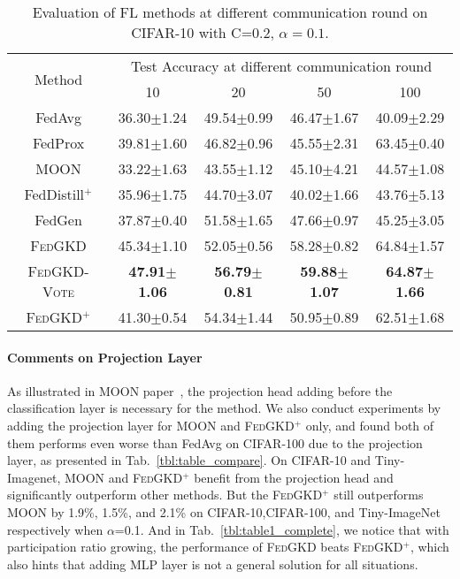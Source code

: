 \documentclass{article} %
\newcommand{\system}{\textsc{FedGKD}\xspace}
\newcommand{\systemled}{\textsc{FedGKD-Vote}\xspace}
\newcommand{\systemplus}{\textsc{FedGKD$^{+}$}\xspace}
\begin{document}
\begin{table}[tb]
\renewcommand\arraystretch{1.1}
\centering
\small
\caption{ Evaluation of FL methods at different communication round on CIFAR-10 with C=0.2, $\alpha=0.1$.}
\begin{tabular}{ccccc}
\hline
\multirow{2}{*}{Method}  & \multicolumn{4}{c}{Test Accuracy at different communication round} \\

\cline{2-5}
   & 10 & 20 & 50 & 100  \\
  \hline
  
  FedAvg  &36.30$\pm$1.24 &49.54$\pm$0.99 &46.47$\pm$1.67 &40.09$\pm$2.29 \\
  \hline
  FedProx  &39.81$\pm$1.60 &46.82$\pm$0.96 &45.55$\pm$2.31 &63.45$\pm$0.40 \\
  \hline
  MOON   &33.22$\pm$1.63 &43.55$\pm$1.12 &45.10$\pm$4.21 &44.57$\pm$1.08  \\
  \hline
  FedDistill$^{+}$ &35.96$\pm$1.75 &44.70$\pm$3.07 &40.02$\pm$1.66 &43.76$\pm$5.13 \\
  \hline
  FedGen  &37.87$\pm$0.40 &51.58$\pm$1.65 &47.66$\pm$0.97 &45.25$\pm$3.05   \\
  \hline
  \system &45.34$\pm$1.10 &52.05$\pm$0.56 &58.28$\pm$0.82 &64.84$\pm$1.57  \\
  \systemled  &\bf{47.91$\pm$1.06} & \bf{56.79$\pm$0.81} &\bf{59.88$\pm$1.07}& \bf{64.87$\pm$1.66}  \\
  \systemplus  &41.30$\pm$0.54 &54.34$\pm$1.44 &50.95$\pm$0.89 &62.51$\pm$1.68  \\
  \bottomrule
  \end{tabular}
 
 \label{tbl:acc_straggler}
\end{table}

\paragraph{Comments on Projection Layer}
As illustrated in MOON paper~\citep{li2021model}, the projection head adding before the classification layer is necessary for the method. We also conduct experiments by  adding the projection layer for MOON and \systemplus only, and found both of them performs even worse than FedAvg on CIFAR-100 due to the projection layer, as presented in Tab.~\ref{tbl:table_compare}. On CIFAR-10 and Tiny-Imagenet, MOON and \systemplus benefit from the projection head and significantly outperform other methods. But the \systemplus still outperforms MOON by 1.9\%, 1.5\%, and 2.1\% on CIFAR-10,CIFAR-100, and Tiny-ImageNet respectively when $\alpha$=0.1. And in Tab.~\ref{tbl:table1_complete}, we notice that with participation ratio growing, the performance of \system beats \systemplus, which also hints that adding MLP layer is not a general solution for all situations.
\end{document}
